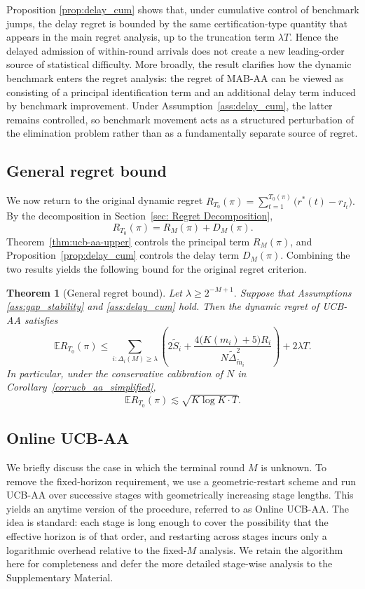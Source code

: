 \documentclass[11pt]{article}
\newtheorem{theorem}{Theorem}
\begin{document}
Proposition \ref{prop:delay_cum} shows that, under cumulative control of benchmark jumps, the delay regret is bounded by the same certification-type quantity that appears in the main regret analysis, up to the truncation term $\lambda T$. Hence the delayed admission of within-round arrivals does not create a new leading-order source of statistical difficulty. More broadly, the result clarifies how the dynamic benchmark enters the regret analysis: the regret of MAB-AA can be viewed as consisting of a principal identification term and an additional delay term induced by benchmark improvement. Under Assumption~\ref{ass:delay_cum}, the latter remains controlled, so benchmark movement acts as a structured perturbation of the elimination problem rather than as a fundamentally separate source of regret.


\subsection{General regret bound}

We now return to the original dynamic regret
\(
R_{T_0}(\pi)
=
\sum_{t=1}^{T_0(\pi)}\bigl(r^*(t)-r_{I_t}\bigr).
\)
By the decomposition in Section~\ref{sec: Regret Decomposition},
\[
R_{T_0}(\pi)=R_M(\pi)+D_M(\pi).
\]
Theorem~\ref{thm:ucb-aa-upper} controls the principal term \(R_M(\pi)\), and Proposition~\ref{prop:delay_cum} controls the delay term \(D_M(\pi)\). Combining the two results yields the following bound for the original regret criterion.

\begin{theorem}[General regret bound]
\label{thm:general bound}
Let 
\(
\lambda \ge 2^{-M+1}.
\)
Suppose that Assumptions \ref{ass:gap_stability} and \ref{ass:delay_cum} hold. Then the dynamic regret of UCB-AA satisfies
\[
\mathbb{E} R_{T_0}(\pi)
\le
\sum_{i:\Delta_i(M)\ge \lambda}
\left(
2\tilde S_i+
\frac{4\bigl(K(m_i)+5\bigr)R_i}{N\tilde\Delta_{\tilde m_i}^2}
\right)
+2\lambda T .
\]
In particular, under the conservative calibration of $N$ in Corollary~\ref{cor:ucb_aa_simplified},
\[
\mathbb{E}R_{T_0}(\pi)\lesssim \sqrt{K\log K\cdot T}.
\]
\end{theorem}

\subsection{Online UCB-AA}
\label{sec:online}

We briefly discuss the case in which the terminal round \(M\) is unknown. To remove the fixed-horizon requirement, we use a geometric-restart scheme and run UCB-AA over successive stages with geometrically increasing stage lengths. This yields an anytime version of the procedure, referred to as Online UCB-AA. The idea is standard: each stage is long enough to cover the possibility that the effective horizon is of that order, and restarting across stages incurs only a logarithmic overhead relative to the fixed-\(M\) analysis. We retain the algorithm here for completeness and defer the more detailed stage-wise analysis to the Supplementary Material.
\end{document}
